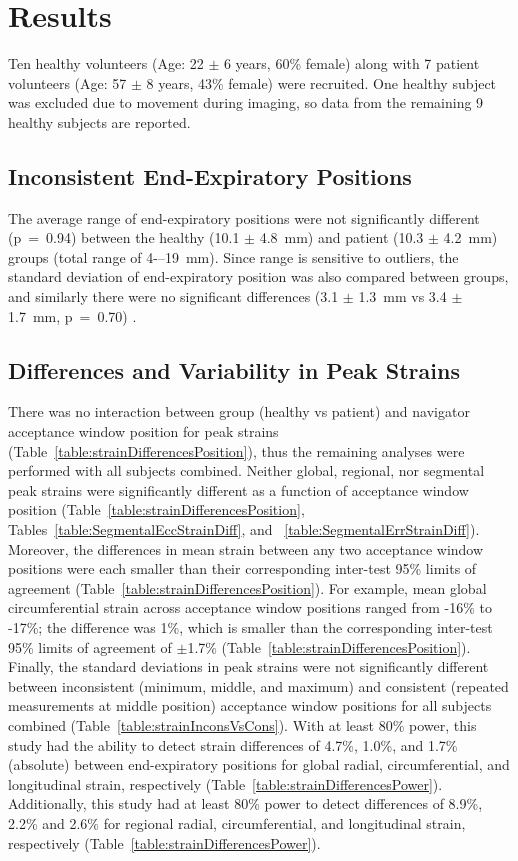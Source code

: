 \section{Results}
	Ten healthy volunteers (Age: 22 $\pm$ 6 years, 60\% female) along with 7 patient volunteers (Age: 57 $\pm$ 8 years, 43\% female) were recruited. One healthy subject was excluded due to movement during imaging, so data from the remaining 9 healthy subjects are reported.
	
\subsection{Inconsistent End-Expiratory Positions}
	The average range of end-expiratory positions were not significantly different (p~=~0.94) between the healthy (10.1 $\pm$ 4.8~mm) and patient (10.3 $\pm$ 4.2~mm) groups (total range of 4-–19~mm). Since range is sensitive to outliers, the standard deviation of end-expiratory position was also compared between groups, and similarly there were no significant differences (3.1 $\pm$ 1.3~mm vs 3.4 $\pm$ 1.7~mm, p~=~0.70) \cite{Hamlet2017}.
	
\subsection{Differences and Variability in Peak Strains}
	There was no interaction between group (healthy vs patient) and navigator acceptance window position for peak strains (Table~\ref{table:strainDifferencesPosition}), thus the remaining analyses were performed with all subjects combined. Neither global, regional, nor segmental peak strains were significantly different as a function of acceptance window position (Table~\ref{table:strainDifferencesPosition}, Tables~\ref{table:SegmentalEccStrainDiff}, and ~\ref{table:SegmentalErrStrainDiff}). Moreover, the differences in mean strain between any two acceptance window positions were each smaller than their corresponding inter-test 95\% limits of agreement (Table~\ref{table:strainDifferencesPosition}). For example, mean global circumferential strain across acceptance window positions ranged from -16\% to -17\%; the difference was 1\%, which is smaller than the corresponding inter-test 95\% limits of agreement of $\pm$1.7\% (Table~\ref{table:strainDifferencesPosition}). Finally, the standard deviations in peak strains were not significantly different between inconsistent (minimum, middle, and maximum) and consistent (repeated measurements at middle position) acceptance window positions for all subjects combined (Table~\ref{table:strainInconsVsCons}). With at least 80\% power, this study had the ability to detect strain differences of 4.7\%, 1.0\%, and 1.7\% (absolute) between end-expiratory positions for global radial, circumferential, and longitudinal strain, respectively (Table~\ref{table:strainDifferencesPower}). Additionally, this study had at least 80\% power to detect differences of 8.9\%, 2.2\% and 2.6\% for regional radial, circumferential, and longitudinal strain, respectively (Table~\ref{table:strainDifferencesPower}).
	
